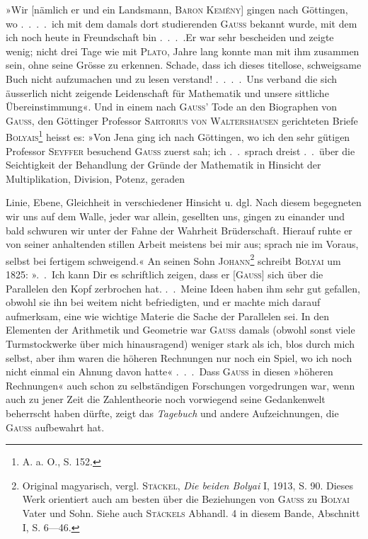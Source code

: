 »Wir [nämlich er und ein Landsmann, \textsc{Baron Kemény}] gingen nach Göttingen,
wo .\ .\ .\ .\ ich mit dem damals dort studierenden \textsc{Gauss} bekannt wurde,
mit dem ich noch heute in Freundschaft bin .\ .\ .\ .\quad Er war sehr bescheiden
und zeigte wenig; nicht drei Tage wie mit \textsc{Plato}, Jahre lang konnte man
mit ihm zusammen sein, ohne seine Grösse zu erkennen. Schade, dass ich
dieses titellose, schweigsame Buch nicht aufzumachen und zu lesen verstand!
.\ .\ .\ .\ Uns verband die sich äusserlich nicht zeigende Leidenschaft für Mathematik
und unsere sittliche Übereinstimmung«. Und in einem nach \textsc{Gauss}’ Tode
an den Biographen von \textsc{Gauss}, den Göttinger Professor \textsc{Sartorius von Waltershausen}
gerichteten Briefe \textsc{Bolyais}\footnote{A. a. O., S. 152.} heisst es: »Von Jena ging ich nach Göttingen,
wo ich den sehr gütigen Professor \textsc{Seyffer} besuchend \textsc{Gauss} zuerst
sah; ich .\ .\ sprach dreist .\ .\ über die Seichtigkeit der Behandlung der Gründe
der Mathematik in Hinsicht der Multiplikation, Division, Potenz, geraden\par
\clearpage{}
\noindent Linie, Ebene, Gleichheit in verschiedener Hinsicht u. dgl. Nach diesem begegneten
wir uns auf dem Walle, jeder war allein, gesellten uns, gingen zu
einander und bald schwuren wir unter der Fahne der Wahrheit Brüderschaft.
Hierauf ruhte er von seiner anhaltenden stillen Arbeit meistens bei mir aus;
sprach nie im Voraus, selbst bei fertigem schweigend.« An seinen Sohn \textsc{Johann}\footnote{Original magyarisch, vergl. \textsc{Stäckel}, \textit{Die beiden Bolyai} I, 1913, S. 90. Dieses Werk orientiert auch am besten über die Beziehungen von \textsc{Gauss} zu \textsc{Bolyai} Vater und Sohn. Siehe auch \textsc{Stäckels} Abhandl. 4 in diesem Bande, Abschnitt I, S. 6—46.}
schreibt \textsc{Bolyai} um 1825: ».\ .\ Ich kann Dir es schriftlich zeigen, dass
er [\textsc{Gauss}] sich über die Parallelen den Kopf zerbrochen hat. .\ .\ Meine Ideen
haben ihm sehr gut gefallen, obwohl sie ihn bei weitem nicht befriedigten,
und er machte mich darauf aufmerksam, eine wie wichtige Materie die Sache
der Parallelen sei. In den Elementen der Arithmetik und Geometrie war
\textsc{Gauss} damals (obwohl sonst viele Turmstockwerke über mich hinausragend)
weniger stark als ich, blos durch mich selbst, aber ihm waren die höheren
Rechnungen nur noch ein Spiel, wo ich noch nicht einmal ein Ahnung davon
hatte« .\ .\ .\ Dass \textsc{Gauss} in diesen »höheren Rechnungen« auch schon zu
selbständigen Forschungen vorgedrungen war, wenn auch zu jener Zeit die
Zahlentheorie noch vorwiegend seine Gedankenwelt beherrscht haben dürfte,
zeigt das \textit{Tagebuch} und andere Aufzeichnungen, die \textsc{Gauss} aufbewahrt hat.

